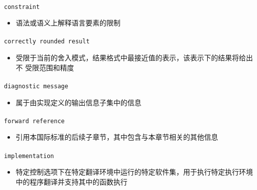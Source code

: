 \paragraph{}
\texttt{constraint}
\begin{itemize}
  \item[]{语法或语义上解释语言要素的限制}
\end{itemize}

\paragraph{}
\texttt{correctly rounded result}
\begin{itemize}
  \item[]{受限于当前的舍入模式，结果格式中最接近值的表示，该表示下的结果将给出不
    受限范围和精度}
\end{itemize}

\paragraph{}
\texttt{diagnostic message}
\begin{itemize}
  \item[]{属于由实现定义的输出信息子集中的信息}
\end{itemize}

\paragraph{}
\texttt{forward reference}
\begin{itemize}
  \item[]{引用本国际标准的后续子章节，其中包含与本章节相关的其他信息}
\end{itemize}

\paragraph{}
\texttt{implementation}
\begin{itemize}
  \item[]{特定控制选项下在特定翻译环境中运行的特定软件集，用于执行特定执行环境
    中的程序翻译并支持其中的函数执行}
\end{itemize}

